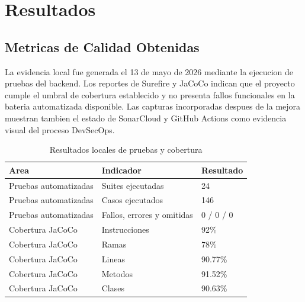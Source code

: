 \documentclass[11pt,oneside]{article}
\begin{document}
\section{Resultados}

\subsection{Metricas de Calidad Obtenidas}

La evidencia local fue generada el 13 de mayo de 2026 mediante la ejecucion de pruebas del backend. Los reportes de Surefire y JaCoCo indican que el proyecto cumple el umbral de cobertura establecido y no presenta fallos funcionales en la bateria automatizada disponible. Las capturas incorporadas despues de la mejora muestran tambien el estado de SonarCloud y GitHub Actions como evidencia visual del proceso DevSecOps.

\begin{table}[H]
\centering
\small
\caption{Resultados locales de pruebas y cobertura}
\begin{tabularx}{\textwidth}{p{}Yp{.20\textwidth}}
\toprule
Area & Indicador & Resultado\\
\midrule
Pruebas automatizadas & Suites ejecutadas & 24\\
Pruebas automatizadas & Casos ejecutados & 146\\
Pruebas automatizadas & Fallos, errores y omitidas & 0 / 0 / 0\\
Cobertura JaCoCo & Instrucciones & 92\%\\
Cobertura JaCoCo & Ramas & 78\%\\
Cobertura JaCoCo & Lineas & 90.77\%\\
Cobertura JaCoCo & Metodos & 91.52\%\\
Cobertura JaCoCo & Clases & 90.63\%\\
\bottomrule
\end{tabularx}
\end{table}
\end{document}
